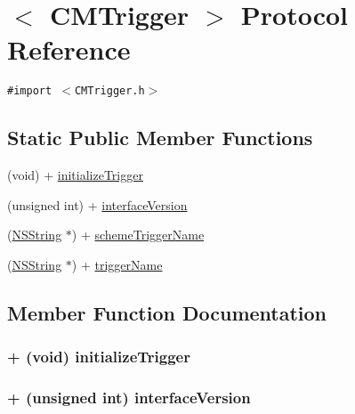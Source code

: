 \hypertarget{protocol_c_m_trigger-p}{
\section{$<$ CMTrigger $>$ Protocol Reference}
\label{protocol_c_m_trigger-p}
}
{\tt \#import $<$CMTrigger.h$>$}

\subsection*{Static Public Member Functions}
\begin{CompactItemize}
\item 
(void) + \hyperlink{protocol_c_m_trigger-p_b50f11dcbde5e1179b53ec38dad51535}{initializeTrigger}
\item 
(unsigned int) + \hyperlink{protocol_c_m_trigger-p_2ad3eb0ab622b02fa86790beed1eb9c8}{interfaceVersion}
\item 
(\hyperlink{class_n_s_string}{NSString} $\ast$) + \hyperlink{protocol_c_m_trigger-p_a49ed0989bec420439226ed5d0c2d156}{schemeTriggerName}
\item 
(\hyperlink{class_n_s_string}{NSString} $\ast$) + \hyperlink{protocol_c_m_trigger-p_4e385df4f91b4740541b812938dd8704}{triggerName}
\end{CompactItemize}


\subsection{Member Function Documentation}
\hypertarget{protocol_c_m_trigger-p_b50f11dcbde5e1179b53ec38dad51535}{
\subsubsection[initializeTrigger]{\setlength{\rightskip}{0pt plus 5cm}+ (void) initializeTrigger }}
\label{protocol_c_m_trigger-p_b50f11dcbde5e1179b53ec38dad51535}


\hypertarget{protocol_c_m_trigger-p_2ad3eb0ab622b02fa86790beed1eb9c8}{
\subsubsection[interfaceVersion]{\setlength{\rightskip}{0pt plus 5cm}+ (unsigned int) interfaceVersion }}
\label{protocol_c_m_trigger-p_2ad3eb0ab622b02fa86790beed1eb9c8}


